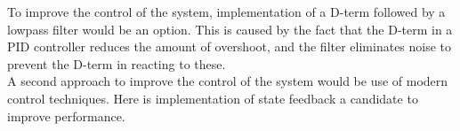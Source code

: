 \documentclass[../../main]{subfiles}
\begin{document}
To improve the control of the system, implementation of a D-term followed by a lowpass filter would be an option. This is caused by the fact that the D-term in a PID controller reduces the amount of overshoot, and the filter eliminates noise to prevent the D-term in reacting to these.\\
A second approach to improve the control of the system would be use of modern control techniques. Here is implementation of state feedback a candidate to improve performance.



  \def\svgwidth{\textwidth}
  



  \def\svgwidth{\textwidth}
  



  \def\svgwidth{\textwidth}
  
\end{document}

